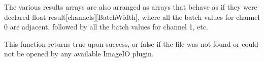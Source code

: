 The various results arrays are also arranged as arrays that behave as if
they were declared {\cf  float result[channels][BatchWidth]}, where all the
batch values for channel 0 are adjacent, followed by all the batch values
for channel 1, etc.

This function returns {\cf true} upon success, or {\cf false} if the
file was not found or could not be opened by any available ImageIO
plugin.
\apiend

\begin{comment}
\apiitem{bool {\ce shadow} (ustring filename, TextureOptBatch \&options,\\
\bigspc                         Tex::RunMask mask, \\
\bigspc                         const float *P, const float *dPdx,\\
\bigspc                         const float *dPdy, int nchannels, float *result,\\
\bigspc                         float *dresultds=nullptr, float *dresultdt=nullptr)\\[2ex]
bool {\ce shadow} (TextureHandle *texture_handle,  Perthread *thread_info, \\
\bigspc                         TextureOptBatch \&options,\\
\bigspc                         Tex::RunMask mask, \\
\bigspc                         const float *P, const float *dPdx,\\
\bigspc                         const float *dPdy, int nchannels, float *result,\\
\bigspc                         float *dresultds=nullptr, float *dresultdt=nullptr)}

Perform filtered shadow map lookups on a batch of positions from
the same texture, all at once. The ``point-like'' parameters {\cf P},
{\cf dPdx}, and {\cf dPdy} are each a pointers to arrays of
{\cf float value[3][BatchWidth]}. That is, each one points to all the $x$ values
for the batch, immediately followed by all the $y$ values, followed by the
$z$ values.

The various results arrays are also arranged as arrays that behave as if
they were declared {\cf  float result[channels][BatchWidth]}, where all the
batch values for channel 0 are adjacent, followed by all the batch values
for channel 1, etc.

This function returns {\cf true} upon success, or {\cf false} if the
file was not found or could not be opened by any available ImageIO
plugin.
\apiend
\end{comment}

